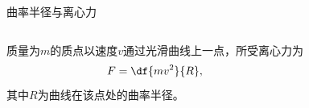 \begin{frame}{曲率半径与离心力}
	\linespread{1.2}
	\begin{columns}
			质量为$m$的质点以速度$v$通过光滑曲线上一点，所受离心力为
			$$F=\df{mv^2}{R},$$
			其中$R$为曲线在该点处的曲率半径。
			\begin{center}
			\end{center}
	\end{columns}
\end{frame}


